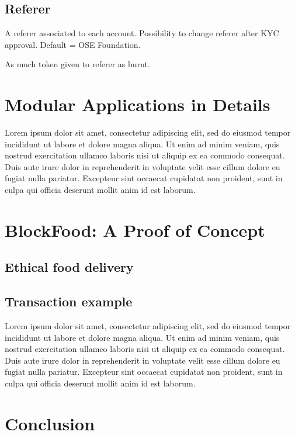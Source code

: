 \documentclass[a4paper]{article}
\begin{document}
\subsection{Referer}

A referer associated to each account.
Possibility to change referer after KYC approval.
Default = OSE Foundation.

As much token given to referer as burnt.

\newpage

\section{Modular Applications in Details}

Lorem ipsum dolor sit amet, consectetur adipiscing elit, sed do eiusmod tempor incididunt ut labore et dolore magna aliqua. Ut enim ad minim veniam, quis nostrud exercitation ullamco laboris nisi ut aliquip ex ea commodo consequat. Duis aute irure dolor in reprehenderit in voluptate velit esse cillum dolore eu fugiat nulla pariatur. Excepteur sint occaecat cupidatat non proident, sunt in culpa qui officia deserunt mollit anim id est laborum.

\newpage

\section{BlockFood: A Proof of Concept}

\subsection{Ethical food delivery}

\subsection{Transaction example}

Lorem ipsum dolor sit amet, consectetur adipiscing elit, sed do eiusmod tempor incididunt ut labore et dolore magna aliqua. Ut enim ad minim veniam, quis nostrud exercitation ullamco laboris nisi ut aliquip ex ea commodo consequat. Duis aute irure dolor in reprehenderit in voluptate velit esse cillum dolore eu fugiat nulla pariatur. Excepteur sint occaecat cupidatat non proident, sunt in culpa qui officia deserunt mollit anim id est laborum.

\newpage

\section{Conclusion}
\end{document}
